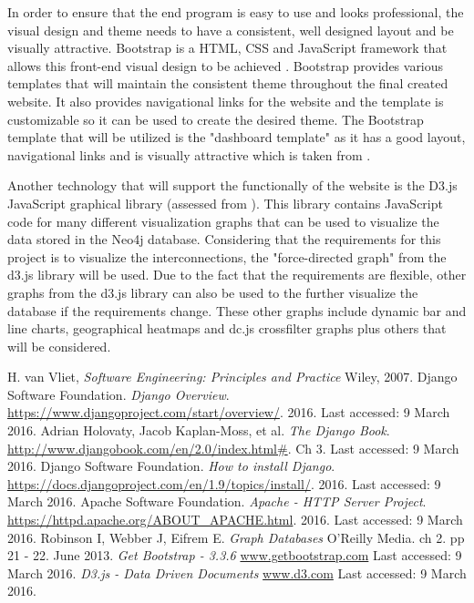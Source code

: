 \documentclass[10pt,onecolumn]{article}
\begin{document}
In order to ensure that the end program is easy to use and looks professional, the visual design and theme needs to have a consistent, well designed layout and be visually attractive. Bootstrap is a HTML, CSS and JavaScript framework that allows this front-end visual design to be achieved \cite{Bootstrap}. Bootstrap provides various templates that will maintain the consistent theme throughout the final created website. It also provides navigational links for the website and the template is customizable so it can be used to create the desired theme. The Bootstrap template that will be utilized is the "dashboard template" as it has a good layout, navigational links and is visually attractive which is taken from \cite{Bootstrap}.

Another technology that will support the functionally of the website is the D3.js JavaScript graphical library (assessed from \cite{D3}). This library contains JavaScript code for many different visualization graphs that can be used to visualize the data stored in the Neo4j database. Considering that the requirements for this project is to visualize the interconnections, the "force-directed graph" from the d3.js library will be used. Due to the fact that the requirements are flexible, other graphs from the d3.js library can also be used to the further visualize the database if the requirements change. These other graphs include dynamic bar and line charts, geographical heatmaps and dc.js crossfilter graphs plus others that will be considered. 

\begin{thebibliography}{1}
 H. van Vliet, \emph{Software Engineering: Principles and Practice} Wiley, 2007.
 Django Software Foundation. \emph{Django Overview}. \url{https://www.djangoproject.com/start/overview/}. 2016. Last accessed: 9 March 2016. 
 Adrian Holovaty, Jacob Kaplan-Moss, et al. \emph{The Django Book}. \url{http://www.djangobook.com/en/2.0/index.html#}. Ch 3. Last accessed: 9 March 2016.
 Django Software Foundation. \emph{How to install Django}. \url{https://docs.djangoproject.com/en/1.9/topics/install/}. 2016. Last accessed: 9 March 2016.	
 Apache Software Foundation. \emph{Apache - HTTP Server Project}. \url{https://httpd.apache.org/ABOUT_APACHE.html}. 2016. Last accessed: 9 March 2016.	
 Robinson I, Webber J, Eifrem E. \emph{Graph Databases} O'Reilly Media. ch 2. pp 21 - 22. June 2013.
  \emph{Get Bootstrap - 3.3.6} \url{www.getbootstrap.com} Last accessed: 9 March 2016.
  \emph{D3.js - Data Driven Documents} \url{www.d3.com} Last accessed: 9 March 2016.


\end{thebibliography}

\clearpage
\end{document}
